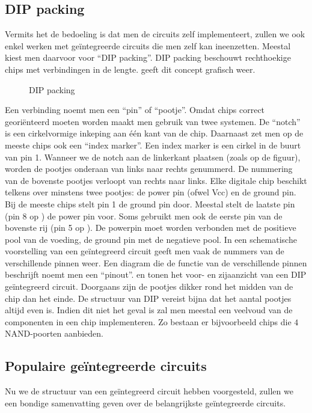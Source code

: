 \subsection{DIP packing}
Vermits het de bedoeling is dat men de circuits zelf implementeert, zullen we ook enkel werken met ge\"integreerde circuits die men zelf kan ineenzetten. Meestal kiest men daarvoor voor ``DIP packing''. DIP packing beschouwt rechthoekige chips met verbindingen in de lengte.  geeft dit concept grafisch weer.
\begin{figure}[hbt]
\centering
{}
\caption{DIP packing}
\end{figure}
Een verbinding noemt men een ``pin'' of ``pootje''. Omdat chips correct geori\"enteerd moeten worden maakt men gebruik van twee systemen. De ``notch'' is een cirkelvormige inkeping aan \'e\'en kant van de chip. Daarnaast zet men op de meeste chips ook een ``index marker''. Een index marker is een cirkel in de buurt van pin 1. Wanneer we de notch aan de linkerkant plaatsen (zoals op de figuur), worden de pootjes onderaan van links naar rechts genummerd. De nummering van de bovenste pootjes verloopt van rechts naar links. Elke digitale chip beschikt telkens over minstens twee pootjes: de power pin (ofwel \mbox{Vcc}) en de ground pin. Bij de meeste chips stelt pin 1 de ground pin door. Meestal stelt de laatste pin (pin 8 op ) de power pin voor. Soms gebruikt men ook de eerste pin van de bovenste rij (pin 5 op ). De powerpin moet worden verbonden met de positieve pool van de voeding, de ground pin met de negatieve pool. In een schematische voorstelling van een ge\"integreerd circuit geeft men vaak de nummers van de verschillende pinnen weer. Een diagram die de functie van de verschillende pinnen beschrijft noemt men een ``pinout''.  en  tonen het voor- en zijaanzicht van een DIP ge\"integreerd circuit. Doorgaans zijn de pootjes dikker rond het midden van de chip dan het einde. De structuur van DIP vereist bijna dat het aantal pootjes altijd even is. Indien dit niet het geval is zal men meestal een veelvoud van de componenten in een chip implementeren. Zo bestaan er bijvoorbeeld chips die $4$ NAND-poorten aanbieden.
\subsection{Populaire ge\"integreerde circuits}
Nu we de structuur van een ge\"integreerd circuit hebben voorgesteld, zullen we een bondige samenvatting geven over de belangrijkste ge\"integreerde circuits.
